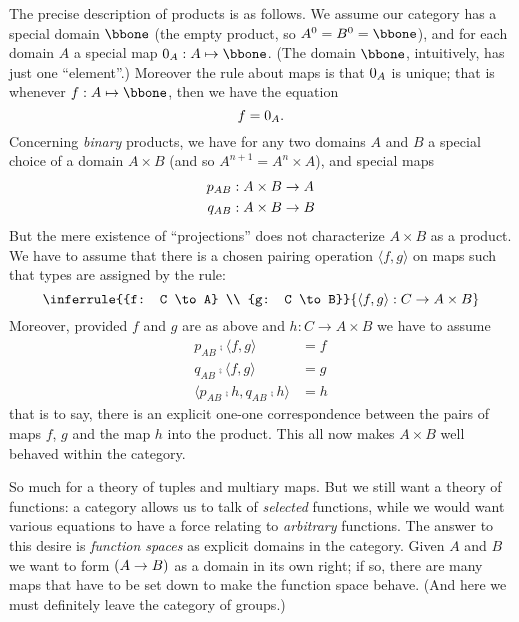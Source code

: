 The precise description of products is as follows. We assume our category has a special
domain $\bbone$ (the empty product, so $A^0 = B^0 = {\bbone}$), and for each domain $A$ a
special map $\zeromap_A: A \mapsto \bbone$. (The domain $\bbone$, intuitively, has just
one ``element''.)  Moreover the rule about maps is that $0_A$ is unique; that is
whenever $f : A \mapsto \bbone$, then we have the equation
$$f = 0_A .$$
%
Concerning {\it binary} products, we have for any two domains $A$ and $B$ a special choice
of a domain $A \times B$ (and so $A^{n+1} = A^n \times A$), and special maps
\begin{align*}
p_{AB}&: A \times B \rightarrow A\\
q_{AB}&: A \times B \rightarrow B
\end{align*}
%
But the mere existence of ``projections'' does not characterize $A \times B$ as a product.
We have to assume that there is a chosen pairing operation $\langle f,g \rangle$ on maps
such that types are assigned by the rule:
%
$$
\inferrule
  {{f: C \to A} \\ {g: C \to B}}
  {\langle f,g \rangle: C \to A \times B}
$$
%
Moreover, provided $f$ and $g$ are as above and $h: C \to A \times B $ we have to assume
\begin{align*}
p_{AB} \comp \langle f,g \rangle &= f\\
q_{AB} \comp \langle f,g \rangle &= g\\
\langle p_{AB}\comp h, q_{AB}\comp h\rangle &= h
\end{align*}
%
that is to say, there is an explicit one-one correspondence between the pairs of maps $f$,
$g$ and the map $h$ into the product. This all now makes $A \times B$ well behaved within
the category.

So much for a theory of tuples and multiary maps. But we still want a theory of functions:
a category allows us to talk of {\it selected} functions, while we would want various
equations to have a force relating to {\it arbitrary} functions. The answer to this desire
is {\it function spaces} as explicit domains in the category. Given $A$ and $B$ we want to
form $(A \rightarrow B)$ as a domain in its own right; if so, there are many maps that have to be set
down to make the function space behave. (And here we must definitely leave the category of
groups.)

